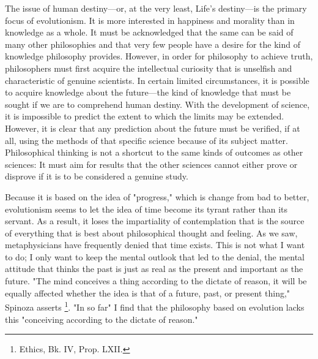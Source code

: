 \documentclass[a4paper,12pt]{book}[2004/02/16]
\theoremstyle{ilemma}
\theoremstyle{itheorem}
\theoremstyle{iother}
\theoremstyle{icorollary}
\theoremstyle{numcorollary}
\theoremstyle{idefinition}
\begin{document}
The issue of human destiny—or, at the very least, Life's destiny—is the primary focus of evolutionism. It is more interested in happiness and morality than in knowledge as a whole. It must be acknowledged that the same can be said of many other philosophies and that very few people have a desire for the kind of knowledge philosophy provides. However, in order for philosophy to achieve truth, philosophers must first acquire the intellectual curiosity that is unselfish and characteristic of genuine scientists.
In certain limited circumstances, it is possible to acquire knowledge about the future—the kind of knowledge that must be sought if we are to comprehend human destiny. With the development of science, it is impossible to predict the extent to which the limits may be extended. However, it is clear that any prediction about the future must be verified, if at all, using the methods of that specific science because of its subject matter. Philosophical thinking is not a shortcut to the same kinds of outcomes as other sciences: It must aim for results that the other sciences cannot either prove or disprove if it is to be considered a genuine study.

Because it is based on the idea of "progress," which is change from bad to better, evolutionism seems to let the idea of time become its tyrant rather than its servant. As a result, it loses the impartiality of contemplation that is the source of everything that is best about philosophical thought and feeling. As we saw, metaphysicians have frequently denied that time exists. This is not what I want to do; I only want to keep the mental outlook that led to the denial, the mental attitude that thinks the past is just as real as the present and important as the future. "The mind conceives a thing according to the dictate of reason, it will be equally affected whether the idea is that of a future, past, or present thing," Spinoza asserts \footnote{Ethics, Bk. IV, Prop. LXII.
}. "In so far" I find that the philosophy based on evolution lacks this "conceiving according to the dictate of reason."
\end{document}

